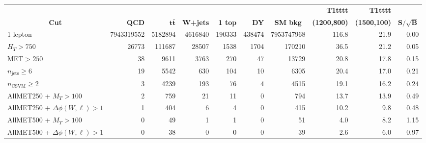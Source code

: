 
\begin{tabular}{ l | rrrrr | r | rr | r}\hline\hline
 &&&&&&& \bf{T1tttt} & \bf{T1tttt} & \\
 \multicolumn{1}{c|}{\bf{Cut}}  & \bf{QCD} & \bf{$\mathbf{t\bar{t}}$} & \bf{W+jets} & \bf{1 top} & \bf{DY} & \multicolumn{1}{c|}{\bf{SM bkg}}  & \multicolumn{1}{c}{\bf{(1200,800)}}  & \multicolumn{1}{c|}{\bf{(1500,100)}} & $\mathbf{S/\sqrt{B}}$ \\ \hline 
 1 lepton & 7943319552 & 5182894 & 4616840 & 190333 & 438474 & 7953747968 & 116.8 & 21.9 & 0.00 \\ 
$H_{T} > 750$ & 26773 & 111687 & 28507 & 1538 & 1704 & 170210 & 36.5 & 21.2 & 0.05 \\ 
MET$ > 250$ & 38 & 9611 & 3763 & 270 & 47 & 13729 & 20.8 & 17.8 & 0.15 \\ 
$n_\text{jets}\geq$6 & 19 & 5542 & 630 & 104 & 10 & 6305 & 20.4 & 17.0 & 0.21 \\ 
$n_\text{CSVM}\geq$2 & 3 & 4239 & 193 & 76 & 4 & 4515 & 19.1 & 16.2 & 0.24 \\ 
\hline 
AllMET250 + $M_{T} > 100$ & 2 & 759 & 21 & 11 & 0 & 794 & 13.7 & 13.9 & 0.49 \\ 
AllMET250 + $\Delta\phi(W,\ell) > 1$ & 1 & 404 & 6 & 4 & 0 & 415 & 10.2 & 9.8 & 0.48 \\ 
\hline 
AllMET500 + $M_{T} > 100$ & 0 & 49 & 1 & 1 & 0 & 51 & 4.0 & 8.2 & 1.15 \\ 
AllMET500 + $\Delta\phi(W,\ell) > 1$ & 0 & 38 & 0 & 0 & 0 & 39 & 2.6 & 6.0 & 0.97 \\ 
\hline\hline
\end{tabular}


